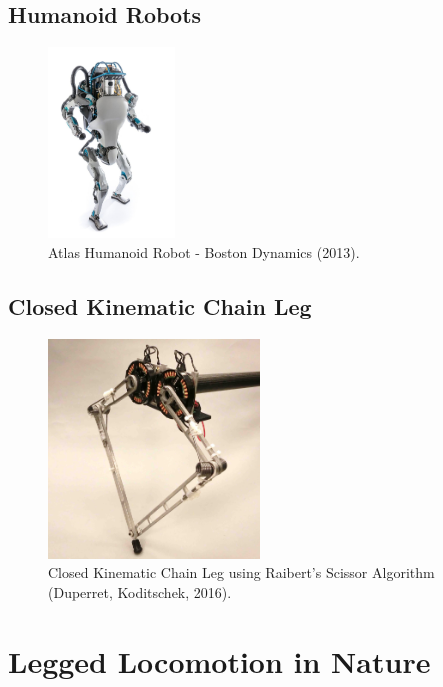 \subsection{Humanoid Robots}

\begin{figure}
\centering
\includegraphics[width=0.3\textwidth]{images/literature/atlas-humanoid.jpg} 
\caption{Atlas Humanoid Robot - Boston Dynamics (2013).}
\label{fig:Atlas Humanoid Robot}
\end{figure}

\subsection{Closed Kinematic Chain Leg}

\begin{figure}
\centering
\includegraphics[width=0.5\textwidth]{images/literature/pen-state-scissor.jpg} 
\caption{Closed Kinematic Chain Leg using Raibert's Scissor Algorithm (Duperret, Koditschek, 2016).\cite{Duperret}}
\label{fig:pen-state-scissor}
\end{figure}

\section{Legged Locomotion in Nature}

